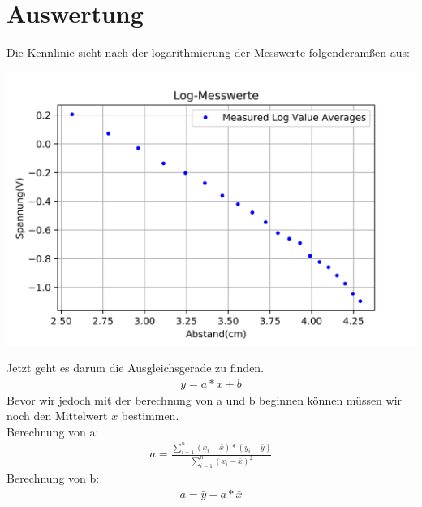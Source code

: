 \documentclass[12pt, oneside, a4paper, \docLanguage]{report}
\begin{document}
\section{Auswertung}
\label{chap:VERSUCH_2_AUSWERTUNG}
\begin{normalsize}
Die Kennlinie sieht nach der logarithmierung der Messwerte folgenderamßen aus:\\
\begin{minipage}{\linewidth}
\begin{center}
\includegraphics[scale=1]{LinearRegrRaw.png}
\end{center}
\end{minipage}
\newline
\newline
Jetzt geht es darum die Ausgleichsgerade zu finden.
\begin{align*}
y = a * x + b
\end{align*}
Bevor wir jedoch mit der berechnung von a und b beginnen können müssen wir noch den Mittelwert $\bar{x}$ bestimmen.\\
\newline
Berechnung von a:
\begin{align*}
a = \frac{\sum_{i=1}^n(x_i-\bar{x}) * (y_i - \bar{y})}{\sum_{i=1}^n(x_i-\bar{x})^2}
\end{align*}
Berechnung von b:
\begin{align*}
a = \bar{y} - a * \bar{x}
\end{align*}
\end{normalsize}
\end{document}
